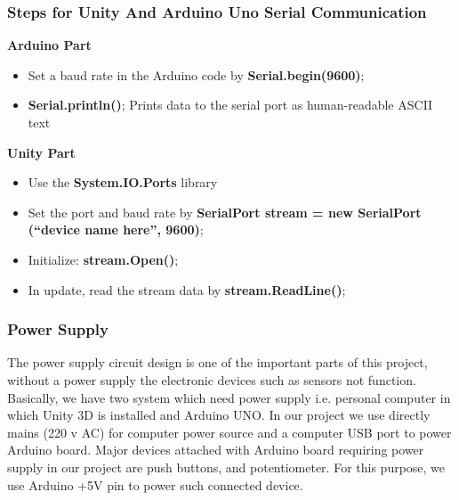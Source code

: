 \documentclass[12pt,a4paper]{article}
\begin{document}
\begin{center}
\begin{center}
\begin{center}
\subsubsection*{Steps for Unity And Arduino Uno Serial Communication}
\textbf{Arduino Part}
\begin{itemize}
	\item 
	Set a baud rate in the Arduino code by \textbf{Serial.begin(9600)};
	\item
		\textbf{Serial.println()}; Prints data to the serial port as human-readable ASCII text 	
\end{itemize}
\textbf{Unity Part}
\begin{itemize}
	\item
		Use the \textbf{System.IO.Ports} library
	\item
		Set the port and baud rate by \textbf{SerialPort stream = new SerialPort (“device name here”, 9600)};
	\item
		Initialize: \textbf{stream.Open()};
	\item
		In update, read the stream data by \textbf{stream.ReadLine()};
	
\end{itemize}


\subsubsection{Power Supply}
The power supply circuit design is one of the important parts of this project, without a power supply the electronic devices such as sensors not function. Basically, we have two system which need power supply i.e. personal computer in which Unity 3D is installed and Arduino UNO. In our project we use directly mains (220 v AC) for computer power source and a computer USB port to power Arduino board. Major devices attached with Arduino board requiring power supply in our project are push buttons, and potentiometer.  For this purpose, we use Arduino +5V pin to power such connected device.



\end{center}
\end{center}
\end{center}
\end{document}
